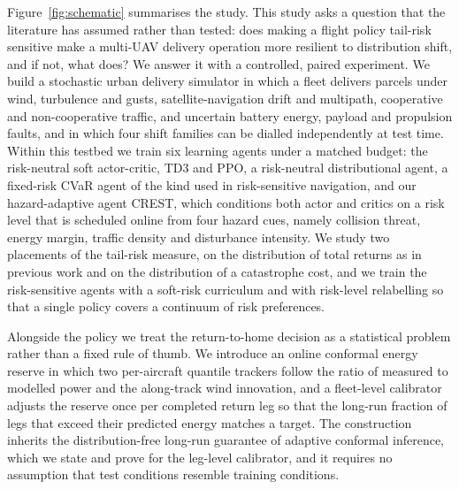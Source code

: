 Figure~\ref{fig:schematic} summarises the study. This study asks a question that the literature has assumed rather than tested: does making a flight policy tail-risk sensitive make a multi-UAV delivery operation more resilient to distribution shift, and if not, what does? We answer it with a controlled, paired experiment. We build a stochastic urban delivery simulator in which a fleet delivers parcels under wind, turbulence and gusts, satellite-navigation drift and multipath, cooperative and non-cooperative traffic, and uncertain battery energy, payload and propulsion faults, and in which four shift families can be dialled independently at test time. Within this testbed we train six learning agents under a matched budget: the risk-neutral soft actor-critic, TD3 and PPO, a risk-neutral distributional agent, a fixed-risk CVaR agent of the kind used in risk-sensitive navigation, and our hazard-adaptive agent CREST, which conditions both actor and critics on a risk level that is scheduled online from four hazard cues, namely collision threat, energy margin, traffic density and disturbance intensity. We study two placements of the tail-risk measure, on the distribution of total returns as in previous work and on the distribution of a catastrophe cost, and we train the risk-sensitive agents with a soft-risk curriculum and with risk-level relabelling so that a single policy covers a continuum of risk preferences.

Alongside the policy we treat the return-to-home decision as a statistical problem rather than a fixed rule of thumb. We introduce an online conformal energy reserve in which two per-aircraft quantile trackers follow the ratio of measured to modelled power and the along-track wind innovation, and a fleet-level calibrator adjusts the reserve once per completed return leg so that the long-run fraction of legs that exceed their predicted energy matches a target. The construction inherits the distribution-free long-run guarantee of adaptive conformal inference, which we state and prove for the leg-level calibrator, and it requires no assumption that test conditions resemble training conditions.

